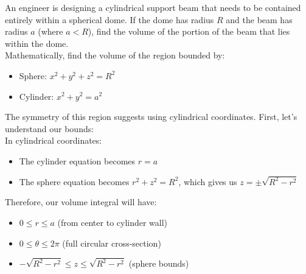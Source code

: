 \exampleline
\begin{example}
An engineer is designing a cylindrical support beam that needs to be contained entirely within a spherical dome. If the dome has radius $R$ and the beam has radius $a$ (where $a < R$), find the volume of the portion of the beam that lies within the dome. \\

\noindent Mathematically, find the volume of the region bounded by:
\begin{itemize}
   \item Sphere: $x^2 + y^2 + z^2 = R^2$
   \item Cylinder: $x^2 + y^2 = a^2$
\end{itemize}

\begin{solution}
The symmetry of this region suggests using cylindrical coordinates. First, let's understand our bounds: \\

\noindent In cylindrical coordinates:
\begin{itemize}
   \item The cylinder equation becomes $r = a$
   \item The sphere equation becomes $r^2 + z^2 = R^2$, which gives us $z = \pm\sqrt{R^2 - r^2}$
\end{itemize}

\noindent Therefore, our volume integral will have:
\begin{itemize}
   \item $0 \leq r \leq a$ (from center to cylinder wall)
   \item $0 \leq \theta \leq 2\pi$ (full circular cross-section)
   \item $-\sqrt{R^2 - r^2} \leq z \leq \sqrt{R^2 - r^2}$ (sphere bounds)
\end{itemize}


\begin{figure}[H]
\centering
{}
\end{figure}
\end{solution}
\end{example}
